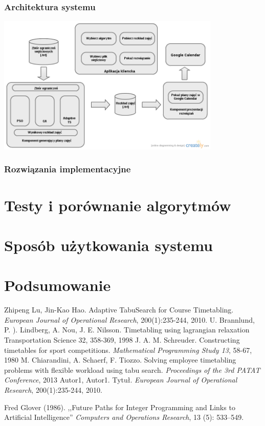 \documentclass[11pt]{report}
\begin{document}
\subsection{Architektura systemu}

\par
\includegraphics[width=0.8\textwidth]{ComponentsDiagram.png}
\subsection{Rozwiązania implementacyjne}
\chapter{Testy i porównanie algorytmów}

\chapter{Sposób użytkowania systemu}
\chapter{Podsumowanie}

\begin{thebibliography}{2}
 Zhipeng Lu, Jin-Kao Hao. Adaptive TabuSearch for Course Timetabling.  \emph{European Journal of Operational Research}, 200(1):235-244, 2010.
 U. Brannlund, P. ). Lindberg, A. Nou, J. E. Nilsson. Timetabling using lagrangian relaxation Transportation Science 32, 358-369, 1998
 J. A. M. Schreuder. Constructing timetables for sport competitions. \emph{Mathematical Programming Study 13}, 58-67, 1980
 M. Chiarandini, A. Schaerf, F. Tiozzo. Solving employee timetabling problems with flexible workload using tabu search. \emph{Proceedings of the 3rd PATAT Conference}, 2013
 Autor1, Autor1. Tytuł.  \emph{European Journal of Operational Research}, 200(1):235-244, 2010.

 Fred Glover (1986). ,,Future Paths for Integer Programming and Links to Artificial Intelligence'' \emph{Computers and Operations Research}, 13 (5): 533–549.

\end{thebibliography}
\end{document}
